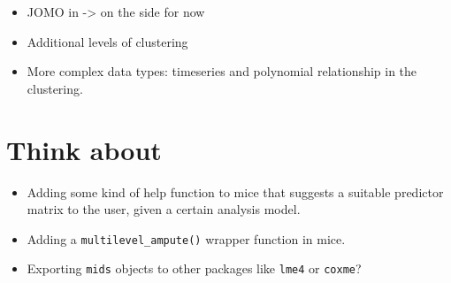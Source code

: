\documentclass[
]{jss}
\begin{document}
\begin{itemize}
\item
  JOMO in  -\textgreater{} on the side for now
\item
  Additional levels of clustering
\item
  More complex data types: timeseries and polynomial relationship in the
  clustering.
\end{itemize}

\hypertarget{think-about}{%
\section{Think about}\label{think-about}}

\begin{itemize}
\item
  Adding some kind of help function to mice that suggests a suitable
  predictor matrix to the user, given a certain analysis model.
\item
  Adding a \texttt{multilevel\_ampute()} wrapper function in mice.
\item
  Exporting \texttt{mids} objects to other packages like \texttt{lme4}
  or \texttt{coxme}?
\end{itemize}

\renewcommand\refname{References}

\end{document}

